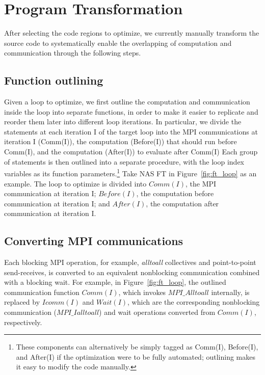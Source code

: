 \section{Program Transformation}
\label{sec-opt}

After selecting the code regions to optimize, we currently manually
transform the source code to systematically enable the overlapping of
computation and communication through the following steps.


\subsection{Function outlining}

Given a loop to optimize, we first outline the computation and
communication inside the loop into separate functions, in order to
make it easier to replicate and reorder them later into different loop
iterations. In particular, we divide the statements at each iteration
I of the target loop into the MPI communications at iteration I
(Comm(I)), the computation (Before(I)) that should run before Comm(I),
and the computation (After(I)) to evaluate after Comm(I) Each group of
statements is then outlined into a separate procedure, with the loop
index variables as its function parameters.\footnote{These components
  can alternatively be simply tagged as Comm(I), Before(I), and
  After(I) if the optimization were to be fully automated; outlining
  makes it easy to modify the code manually.}  Take NAS FT in
Figure~\ref{fig:ft_loop} as an example.  The loop to optimize is
divided into $Comm(I)$, the MPI communication at iteration I;
$Before(I)$, the computation before communication at iteration I; and
$After(I)$, the computation after communication at iteration I.


\subsection{Converting MPI communications}

Each blocking MPI operation, for example, {\em alltoall} collectives
and point-to-point send-receives, is converted to an equivalent
nonblocking communication combined with a blocking wait.  For example,
in Figure~\ref{fig:ft_loop}, the outlined communication function
$Comm(I)$, which invokes $MPI\_Alltoall$ internally, is replaced by
$Icomm(I)$ and $Wait(I)$, which are the corresponding nonblocking
communication ($MPI\_Ialltoall$) and wait operations converted from
$Comm(I)$, respectively.



